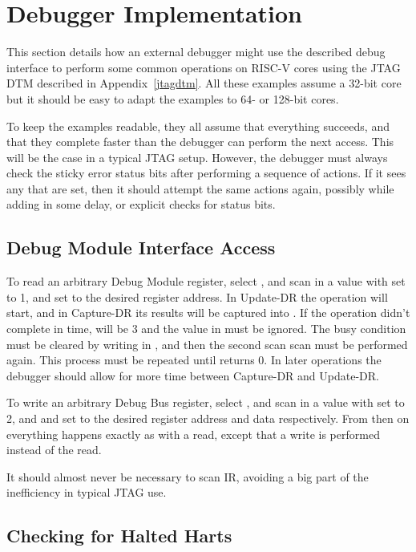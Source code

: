 \chapter{Debugger Implementation}

This section details how an external debugger might use the described debug
interface to perform some common operations on RISC-V cores using the JTAG DTM
described in Appendix~\ref{jtagdtm}.
All these examples assume a 32-bit core but it should be easy to adapt the
examples to 64- or 128-bit cores.

To keep the examples readable, they all assume that everything succeeds, and
that they complete faster than the debugger can perform the next access. This
will be the case in a typical JTAG setup. However, the debugger must always
check the sticky error status bits after performing a sequence of actions. If
it sees any that are set, then it should attempt the same actions again,
possibly while adding in some delay, or explicit checks for status bits.

\section{Debug Module Interface Access} \label{dmiaccess}

To read an arbitrary Debug Module register, select \Rdmi, and scan in a value
with \Fop set to 1, and \Faddress set to the desired register address. In
Update-DR the operation will start, and in Capture-DR its results will be
captured into \Fdata.  If the operation didn't complete in time, \Fop will be 3
and the value in \Fdata must be ignored. The busy condition must be cleared by
writing \Fdmireset in \Rdtmcs, and then the second scan scan must be performed again.
This process must be repeated until \Fop returns 0.
In later operations the debugger should allow for more time between Capture-DR and
Update-DR.

To write an arbitrary Debug Bus register, select \Rdmi, and scan in a value
with \Fop set to 2, and \Faddress and \Fdata set to the desired register
address and data respectively. From then on everything happens exactly as with
a read, except that a write is performed instead of the read.

It should almost never be necessary to scan IR, avoiding a big part of the
inefficiency in typical JTAG use.

\section{Checking for Halted Harts}

